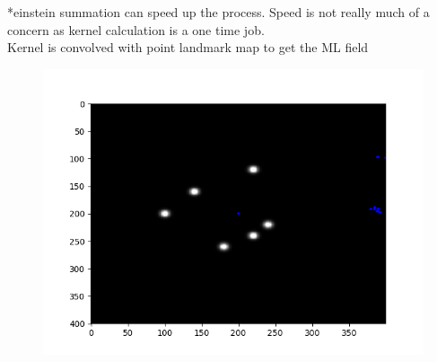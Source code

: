\documentclass{article}
\begin{document}
*einstein summation can speed up the process. Speed is not really much of a concern as kernel calculation is a one time job. \\
Kernel is convolved with point landmark map to get the ML field 
\begin{figure}
\centering
   \includegraphics[width = \linewidth]{./ML field.png}
\end{figure}   
\end{document}
